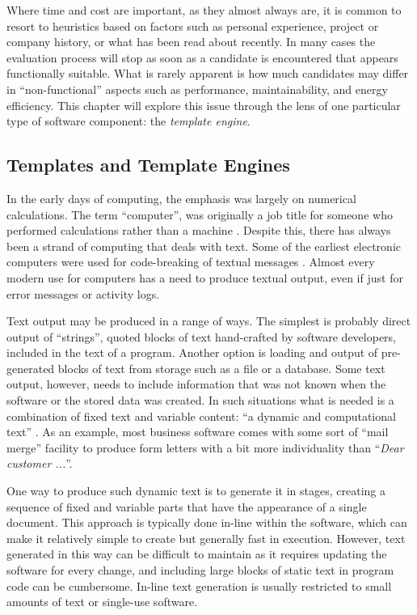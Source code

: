 Where time and cost are important, as they almost always are, it is common to resort to heuristics based on factors such as personal experience, project or company history, or what has been read about recently. In many cases the evaluation process will stop as soon as a candidate is encountered that appears functionally suitable. What is rarely apparent is how much candidates may differ in \enquote{non-functional} aspects such as performance, maintainability, and energy efficiency. This chapter will explore this issue through the lens of one particular type of software component: the \emph{\gls{template engine}}.

\subsection{Templates and Template Engines}
\label{templates and engines}

In the early days of computing, the emphasis was largely on numerical calculations. The term \enquote{computer}, was originally a job title for someone who performed calculations rather than a machine \citep{NASA2016}. Despite this, there has always been a strand of computing that deals with text. Some of the earliest electronic computers were used for code-breaking of textual messages \citep{Copeland2004}.  Almost every modern use for computers has a need to produce textual output, even if just for error messages or activity logs. 

Text output may be produced in a range of ways. The simplest is probably direct output of \enquote{strings}, quoted blocks of text hand-crafted by software developers, included in the text of a program. Another option is loading and output of pre-generated blocks of text from storage such as a file or a database. Some text output, however, needs to include information that was not known when the software or the stored data was created. In such situations what is needed is a combination of fixed text and variable content: \enquote{a dynamic and computational text} \citep{Rodgers1999}. As an example, most business software comes with some sort of \enquote{mail merge} facility to produce form letters with a bit more individuality than \enquote{\emph{Dear customer ...}}.

One way to produce such dynamic text is to generate it in stages, creating a sequence of fixed and variable parts that have the appearance of a single document. This approach is typically done in-line within the software, which can make it relatively simple to create but generally fast in execution. However, text generated in this way can be difficult to maintain as it requires updating the software for every change, and including large blocks of static text in program code can be cumbersome. In-line text generation is usually restricted to small amounts of text or single-use software.

